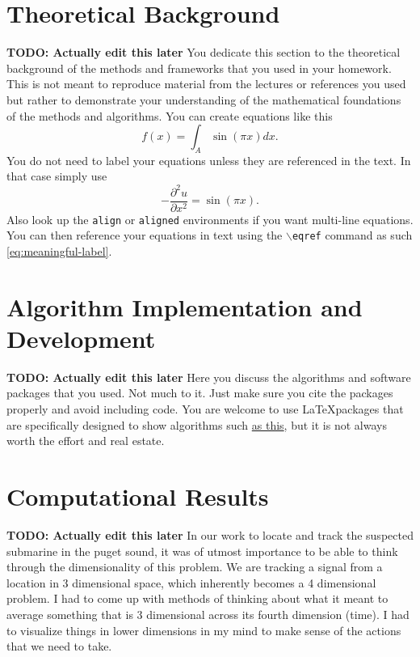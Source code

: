 \documentclass[11pt]{amsart}
\begin{document}
\section{Theoretical Background}\label{sec:theory}
\textbf{TODO: Actually edit this later}
You dedicate this section to the theoretical background of the methods and frameworks 
that you used in your homework. This is not meant to reproduce material from the lectures
 or references you used but rather to demonstrate your understanding of the 
 mathematical foundations of the methods and algorithms. You can create equations like this 
 \begin{equation*}
     f(x) = \int_A \sin( \pi x) dx.
 \end{equation*}
 You do not need to label your equations unless they are referenced in the text. In that 
 case simply use 
 \begin{equation}\label{eq:meaningful-label}
      - \frac{\partial^2 u}{\partial x^2} = \sin ( \pi x).
 \end{equation}
Also look up the \texttt{align} or \texttt{aligned} environments if you want multi-line 
equations. You can then reference your equations in text using the $\backslash$\texttt{eqref}
command as such \eqref{eq:meaningful-label}. 

\section{Algorithm Implementation and Development}\label{sec:algorithms}
\textbf{TODO: Actually edit this later}
Here you discuss the algorithms and software packages that you used. Not much to it. 
Just make sure you cite the packages properly and avoid including code. 
You are welcome to use \LaTeX packages that are specifically designed to show 
algorithms such \href{https://www.overleaf.com/learn/latex/Algorithms}{as this}, but it is 
not always worth the effort and real estate. 


\section{Computational Results}\label{sec:results}
\textbf{TODO: Actually edit this later}
In our work to locate and track the suspected submarine in the puget sound, it was of utmost importance to be able to think through the dimensionality of this problem.
We are tracking a signal from a location in 3 dimensional space, which inherently becomes a 4 dimensional problem.
I had to come up with methods of thinking about what it meant to average something that is 3 dimensional across its fourth dimension (time).
I had to visualize things in lower dimensions in my mind to make sense of the actions that we need to take.
\end{document}
